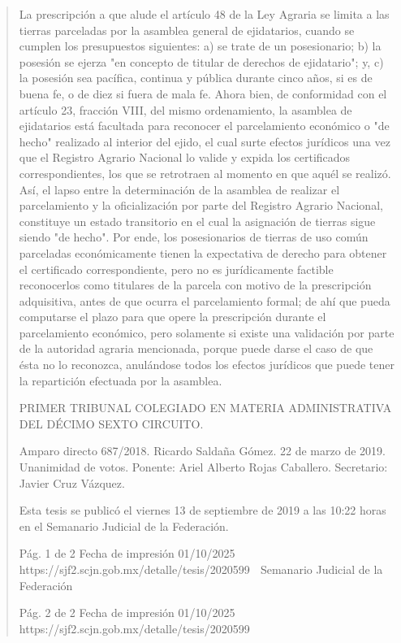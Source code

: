 \documentclass[11pt,a4paper]{article}
\begin{document}
\begin{quote}
La prescripción a que alude el artículo 48 de la Ley Agraria se limita a las tierras parceladas por la
asamblea general de ejidatarios, cuando se cumplen los presupuestos siguientes: a) se trate de un
posesionario; b) la posesión se ejerza "en concepto de titular de derechos de ejidatario"; y, c) la
posesión sea pacífica, continua y pública durante cinco años, si es de buena fe, o de diez si fuera
de mala fe. Ahora bien, de conformidad con el artículo 23, fracción VIII, del mismo ordenamiento, la
asamblea de ejidatarios está facultada para reconocer el parcelamiento económico o "de hecho"
realizado al interior del ejido, el cual surte efectos jurídicos una vez que el Registro Agrario Nacional
lo valide y expida los certificados correspondientes, los que se retrotraen al momento en que aquél
se realizó. Así, el lapso entre la determinación de la asamblea de realizar el parcelamiento y la
oficialización por parte del Registro Agrario Nacional, constituye un estado transitorio en el cual la
asignación de tierras sigue siendo "de hecho". Por ende, los posesionarios de tierras de uso común
parceladas económicamente tienen la expectativa de derecho para obtener el certificado
correspondiente, pero no es jurídicamente factible reconocerlos como titulares de la parcela con
motivo de la prescripción adquisitiva, antes de que ocurra el parcelamiento formal; de ahí que pueda
computarse el plazo para que opere la prescripción durante el parcelamiento económico, pero
solamente si existe una validación por parte de la autoridad agraria mencionada, porque puede
darse el caso de que ésta no lo reconozca, anulándose todos los efectos jurídicos que puede tener
la repartición efectuada por la asamblea.

PRIMER TRIBUNAL COLEGIADO EN MATERIA ADMINISTRATIVA DEL DÉCIMO SEXTO
CIRCUITO.


Amparo directo 687/2018. Ricardo Saldaña Gómez. 22 de marzo de 2019. Unanimidad de votos.
Ponente: Ariel Alberto Rojas Caballero. Secretario: Javier Cruz Vázquez.


Esta tesis se publicó el viernes 13 de septiembre de 2019 a las 10:22 horas en el Semanario
Judicial de la Federación.




                                              Pág. 1 de 2              Fecha de impresión 01/10/2025
  https://sjf2.scjn.gob.mx/detalle/tesis/2020599
                                                 Semanario Judicial de la Federación




                                            Pág. 2 de 2       Fecha de impresión 01/10/2025
https://sjf2.scjn.gob.mx/detalle/tesis/2020599

\end{quote}
\end{document}
